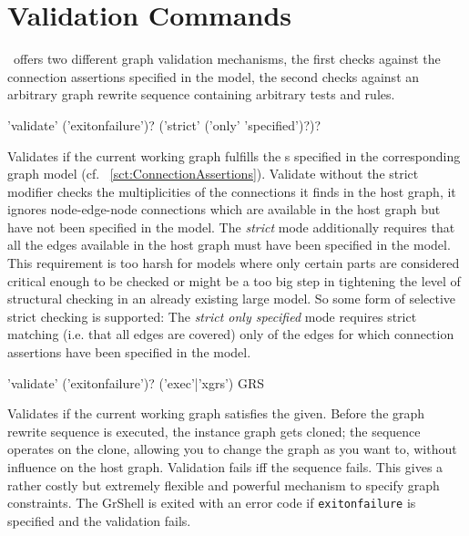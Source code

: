 \section{Validation Commands}\label{sec:validate}

\GrG\ offers two different graph validation mechanisms,
the first checks against the connection assertions specified in the model,
the second checks against an arbitrary graph rewrite sequence containing arbitrary tests and rules.

\begin{rail}
  'validate' ('exitonfailure')? ('strict' ('only' 'specified')?)?
\end{rail}
Validates if the current working graph fulfills the s specified in the corresponding graph model (cf. ~\ref{sct:ConnectionAssertions}).
Validate without the strict modifier checks the multiplicities of the connections it finds in the host graph,
it ignores node-edge-node connections which are available in the host graph but have not been specified in the model.
The \emph{strict} mode additionally requires that all the edges available in the host graph must have been specified in the model.
This requirement is too harsh for models where only certain parts are considered critical enough to be checked
or might be a too big step in tightening the level of structural checking in an already existing large model.
So some form of selective strict checking is supported:
The \emph{strict only specified} mode requires strict matching (i.e. that all edges are covered) only of the edges for which connection assertions have been specified in the model.

\begin{rail}
  'validate' ('exitonfailure')? ('exec'|'xgrs') GRS
\end{rail}
Validates if the current working graph satisfies the  given.
Before the graph rewrite sequence is executed, the instance graph gets cloned;
the sequence operates on the clone, allowing you to change the graph as you want to, without influence on the host graph.
Validation fails iff the sequence fails.
This gives a rather costly but extremely flexible and powerful mechanism to specify graph constraints.
The GrShell is exited with an error code if \texttt{exitonfailure} is specified and the validation fails.

